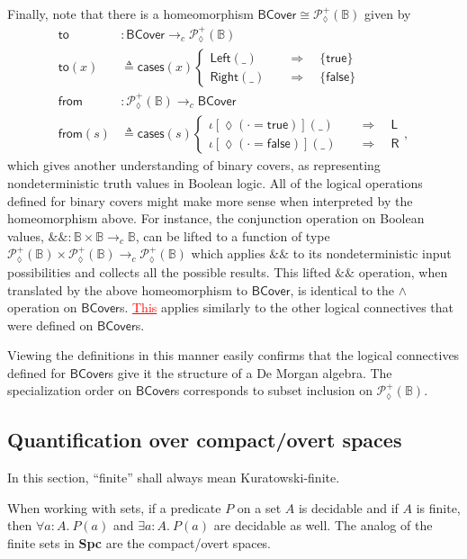 \documentclass[conference]{IEEEtran}
\newcommand{\PLower}{\mathcal{P}_\lozenge}
\newcommand{\cto}{\to_c}
\newcommand{\bool}{\mathbb{B}}
\newcommand{\wildcard}{\_}
\newcommand{\oinclf}[1]{\iota[{#1}]}
\newcommand{\oincl}[2]{\oinclf{#1} \left({#2}\right)}
\newcommand{\Branch}{\Rightarrow}
\newcommand{\btrue}{\mathsf{true}}
\newcommand{\bfalse}{\mathsf{false}}
\newcommand{\BCover}{\mathsf{BCover}}
\newcommand{\grammar}[1]{\textcolor{red}{\underline{#1}}}
\begin{document}
Finally, note that there is a homeomorphism $\BCover \cong \PLower^+(\bool)$ given by
\begin{align*}
\mathsf{to} &: \BCover \cto \PLower^+(\bool)
\\ \mathsf{to}(x) &\triangleq
  \mathsf{cases}(x)
  \begin{cases}
\mathsf{Left}(\wildcard)
 \quad &\Branch \quad
 \{ \btrue \}
\\
\mathsf{Right}(\wildcard)
 \quad &\Branch \quad
 \{ \bfalse \}
  \end{cases}
\\
\mathsf{from} &: \PLower^+(\bool) \cto \BCover
\\ \mathsf{from}(s) &\triangleq
  \mathsf{cases}(s)
  \begin{cases}
 \oincl{\lozenge(\cdot = \btrue)}{\wildcard}
 \quad &\Branch \quad
 \mathsf{L}
\\
 \oincl{\lozenge(\cdot = \bfalse)}{\wildcard}
 \quad &\Branch \quad
 \mathsf{R}
  \end{cases},
\end{align*}
which gives another understanding of binary covers, as representing nondeterministic truth values in Boolean logic. All of the logical operations defined for binary covers might make more sense when interpreted by the homeomorphism above. For instance, the conjunction operation on Boolean values,
$\&\& : \bool \times \bool \cto \bool$, can be lifted to a function of type $\PLower^+(\bool) \times \PLower^+(\bool) \cto \PLower^+(\bool)$ which applies $\&\&$ to its nondeterministic input possibilities and collects all the possible results. This lifted $\&\&$ operation, when translated by the above homeomorphism to $\BCover$, is identical to the $\wedge$ operation on $\BCover$s. \grammar{This} applies similarly to the other logical connectives that were defined on $\BCover$s.

Viewing the definitions in this manner easily confirms that the logical connectives defined for $\BCover$s give it the structure of a De Morgan algebra.
The specialization order on $\BCover$s corresponds to subset inclusion on $\PLower^+(\bool)$.

\subsection{Quantification over compact/overt spaces}

In this section, ``finite'' shall always mean Kuratowski-finite.

When working with sets, if a predicate $P$ on a set $A$ is decidable and if $A$ is finite, then $\forall a : A.\ P(a)$ and $\exists a : A.\ P(a)$ are decidable as well. The analog of the finite sets in \textbf{Spc} are the compact/overt spaces.
\end{document}
